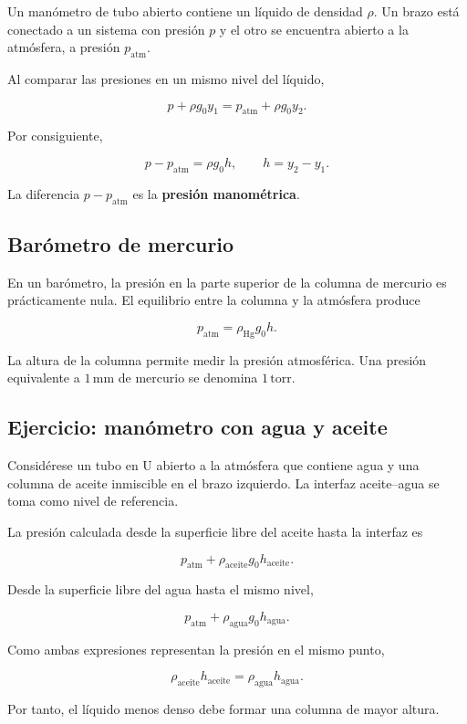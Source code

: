Un manómetro de tubo abierto contiene un líquido de densidad $\rho$. Un brazo
está conectado a un sistema con presión $p$ y el otro se encuentra abierto a
la atmósfera, a presión $p_{\mathrm{atm}}$.

Al comparar las presiones en un mismo nivel del líquido,

$$
p+\rho g_0y_1
=p_{\mathrm{atm}}+\rho g_0y_2.
$$

Por consiguiente,

$$
\boxed{
p-p_{\mathrm{atm}}=\rho g_0h
},
\qquad
h=y_2-y_1.
$$

La diferencia $p-p_{\mathrm{atm}}$ es la \textbf{presión manométrica}.

\subsection{Barómetro de mercurio}

En un barómetro, la presión en la parte superior de la columna de mercurio es
prácticamente nula. El equilibrio entre la columna y la atmósfera produce

$$
\boxed{
p_{\mathrm{atm}}=\rho_{\mathrm{Hg}}g_0h
}.
$$

\figuraMedidoresPresion

La altura de la columna permite medir la presión atmosférica. Una presión
equivalente a $1\,\mathrm{mm}$ de mercurio se denomina $1\,\mathrm{torr}$.

\subsection{Ejercicio: manómetro con agua y aceite}

Considérese un tubo en U abierto a la atmósfera que contiene agua y una columna
de aceite inmiscible en el brazo izquierdo. La interfaz aceite--agua se toma
como nivel de referencia.

\figuraManometroAceiteAgua

La presión calculada desde la superficie libre del aceite hasta la interfaz es

$$
p_{\mathrm{atm}}+\rho_{\mathrm{aceite}}g_0h_{\mathrm{aceite}}.
$$

Desde la superficie libre del agua hasta el mismo nivel,

$$
p_{\mathrm{atm}}+\rho_{\mathrm{agua}}g_0h_{\mathrm{agua}}.
$$

Como ambas expresiones representan la presión en el mismo punto,

$$
\boxed{
\rho_{\mathrm{aceite}}h_{\mathrm{aceite}}
=\rho_{\mathrm{agua}}h_{\mathrm{agua}}
}.
$$

Por tanto, el líquido menos denso debe formar una columna de mayor altura.
